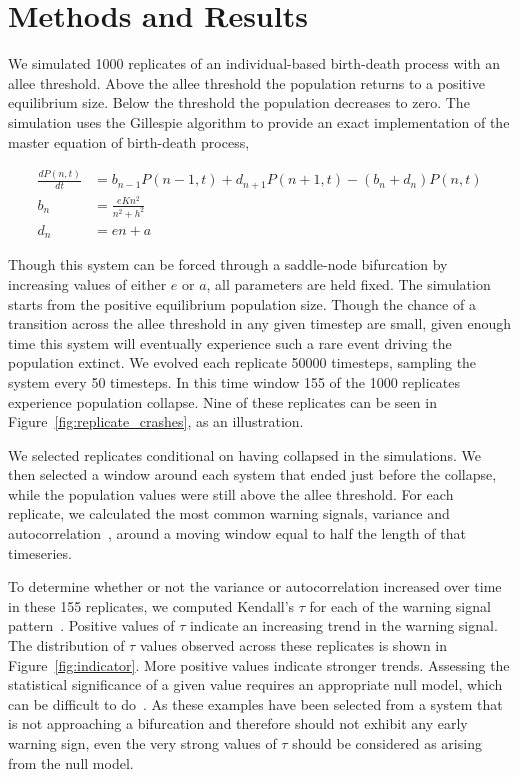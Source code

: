\documentclass[authoryear,preprint,11pt]{elsarticle}
\begin{document}
 \section{Methods and Results}
 We simulated 1000 replicates of an individual-based birth-death process
 with an allee threshold.  Above the allee threshold the population returns
 to a positive equilibrium size.  Below the threshold the population decreases
 to zero. The simulation uses the Gillespie algorithm to provide an exact 
 implementation of the master equation of birth-death process,

\begin{align}
  \frac{dP(n,t)}{dt} &= b_{n-1} P(n-1,t) + d_{n+1}P(n+1,t) - (b_n+d_n) P(n,t)  \label{master} \\
    b_n &= \frac{e K n^2}{n^2 + h^2} \\
    d_n &= e n + a
\end{align}

Though this system can be forced through a saddle-node bifurcation by
increasing values of either $e$ or $a$, all parameters are held fixed.
The simulation starts from the positive equilibrium population size.
Though the chance of a transition across the allee threshold in any 
given timestep are small, given enough time this system will eventually
experience such a rare event driving the population extinct.  We evolved
each replicate 50000 timesteps, sampling the system every 50 timesteps.  
In this time window 155 of the 1000 replicates experience population collapse.  
Nine of these replicates can be seen in Figure~\ref{fig:replicate_crashes},
as an illustration. 

We selected replicates conditional on having collapsed in the simulations.
We then selected a window around each system that ended just before the
collapse, while the population values were still above the allee threshold.
For each replicate, we calculated the most common warning signals, variance
and autocorrelation~\citep[\emph{e.g.}][]{Carpenter2006,Dakos2008,Scheffer2009}, 
around a moving window equal to half the length of that
timeseries.  

To determine whether or not the variance or autocorrelation increased 
over time in these 155 replicates, we computed Kendall's $\tau$ for each of the
warning signal pattern~\citep{Dakos2008, Dakos2010}.  Positive values of $\tau$ 
indicate an increasing trend in the warning signal.  The distribution of $\tau$ 
values observed across these replicates is shown in Figure~\ref{fig:indicator}.
More positive values indicate stronger trends. Assessing the statistical significance
of a given value requires an appropriate null model, which can be difficult 
to do~\citep{Dakos2008}. As these examples have been selected from a system
that is not approaching a bifurcation and therefore should not exhibit any 
early warning sign, even the very strong values of $\tau$ should be considered 
as arising from the null model. 
\end{document}
